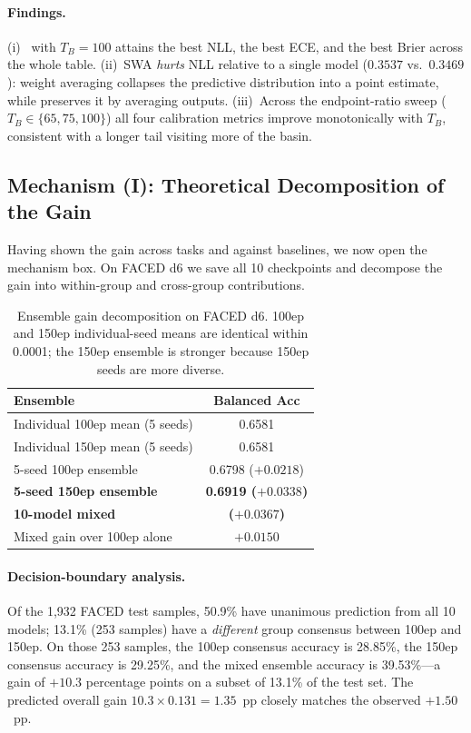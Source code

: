 \paragraph{Findings.}
(i)~\ours{} with $T_B=100$ attains the best NLL, the best ECE, and the
best Brier across the whole table. (ii)~SWA \emph{hurts} NLL relative
to a single model ($0.3537$ vs.\ $0.3469$): weight averaging collapses
the predictive distribution into a point estimate, while \ours{}
preserves it by averaging outputs. (iii)~Across the endpoint-ratio
sweep ($T_B \in \{65, 75, 100\}$) all four calibration metrics improve
monotonically with $T_B$, consistent with a longer tail visiting more
of the basin.

\subsection{Mechanism (I): Theoretical Decomposition of the Gain}
\label{sec:decomp}

Having shown the gain across tasks and against baselines, we now open
the mechanism box. On FACED d6 we save all 10 checkpoints and decompose
the gain into within-group and cross-group contributions.

\begin{table}[h]
\centering
\caption{Ensemble gain decomposition on FACED d6. 100ep and 150ep
individual-seed means are identical within 0.0001; the 150ep ensemble is
stronger because 150ep seeds are more diverse.}
\label{tab:decomposition}
\begin{tabular}{lc}
\toprule
Ensemble & Balanced Acc \\
\midrule
Individual 100ep mean (5 seeds) & 0.6581 \\
Individual 150ep mean (5 seeds) & 0.6581 \\
\midrule
5-seed 100ep ensemble & 0.6798 ($+0.0218$) \\
\textbf{5-seed 150ep ensemble} & \textbf{0.6919 ($+0.0338$)} \\
\textbf{10-model mixed} & \textbf{\facedacc{} ($+0.0367$)} \\
\midrule
Mixed gain over 100ep alone & $+0.0150$ \\
\bottomrule
\end{tabular}
\end{table}

\paragraph{Decision-boundary analysis.}
Of the 1{,}932 FACED test samples, 50.9\% have unanimous prediction from
all 10 models; 13.1\% (253 samples) have a \emph{different} group
consensus between 100ep and 150ep. On those 253 samples, the 100ep
consensus accuracy is 28.85\%, the 150ep consensus accuracy is 29.25\%,
and the mixed ensemble accuracy is 39.53\%---a gain of $+10.3$ percentage
points on a subset of 13.1\% of the test set. The predicted overall gain
$10.3 \times 0.131 = 1.35$~pp closely matches the observed $+1.50$~pp.

